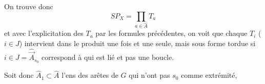 On trouve donc
\[
SP_X=\prod_{a\in\widehat{A}}T_a
\]
et avec l'explicitation des $T_a$ par les formules précédentes, on voit que chaque $T_i$ ($i\in J$) intervient dans le produit une fois et une seule, mais sous forme tordue si $i\in J=\widehat{\vec{A}}_{s_0}$ correspond à   qui est lié et pas une boucle.

Soit donc $\widehat{A}_1\subset\widehat{A}$ l'ens des arêtes de $G$ qui  n'ont pas  $s_0$ comme extrémité,  
